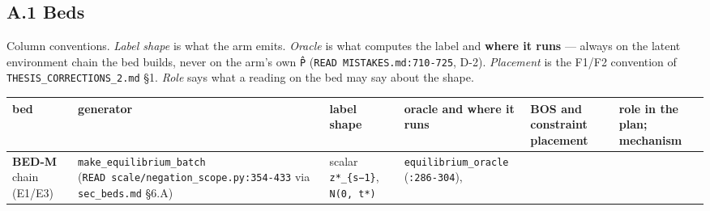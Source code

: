 \documentclass[11pt,a4paper]{article}
\newcounter{none}                 %
\theoremstyle{plain}
\theoremstyle{definition}
\theoremstyle{remark}
\begin{document}
\subsection{A.1 Beds}\label{a.1-beds}

Column conventions. \emph{Label shape} is what the arm emits.
\emph{Oracle} is what computes the label and \textbf{where it runs} ---
always on the latent environment chain the bed builds, never on the
arm's own \texttt{P̂} (\texttt{READ\ MISTAKES.md:710-725}, D-2).
\emph{Placement} is the F1/F2 convention of
\texttt{THESIS\_CORRECTIONS\_2.md} §1. \emph{Role} says what a reading
on the bed may say about the shape.

{\def\LTcaptype{none} %
\begin{longtable}[]{@{}
  >{\raggedright\arraybackslash}p{}
  >{\raggedright\arraybackslash}p{}
  >{\raggedright\arraybackslash}p{}
  >{\raggedright\arraybackslash}p{}
  >{\raggedright\arraybackslash}p{}
  >{\raggedright\arraybackslash}p{}@{}}
\toprule\noalign{}
\begin{minipage}[b]{\linewidth}\raggedright
bed
\end{minipage} & \begin{minipage}[b]{\linewidth}\raggedright
generator
\end{minipage} & \begin{minipage}[b]{\linewidth}\raggedright
label shape
\end{minipage} & \begin{minipage}[b]{\linewidth}\raggedright
oracle and where it runs
\end{minipage} & \begin{minipage}[b]{\linewidth}\raggedright
BOS and constraint placement
\end{minipage} & \begin{minipage}[b]{\linewidth}\raggedright
role in the plan; mechanism
\end{minipage} \\
\midrule\noalign{}
\endhead
\bottomrule\noalign{}
\endlastfoot
\textbf{BED-M} chain (E1/E3) & \texttt{make\_equilibrium\_batch}
(\texttt{READ\ scale/negation\_scope.py:354-433} via
\texttt{sec\_beds.md} §6.A) & scalar \texttt{z*\_\{s−1\}},
\texttt{N(0,\ t*)} & \texttt{equilibrium\_oracle} (\texttt{:286-304}),

\end{longtable}}
\end{document}
